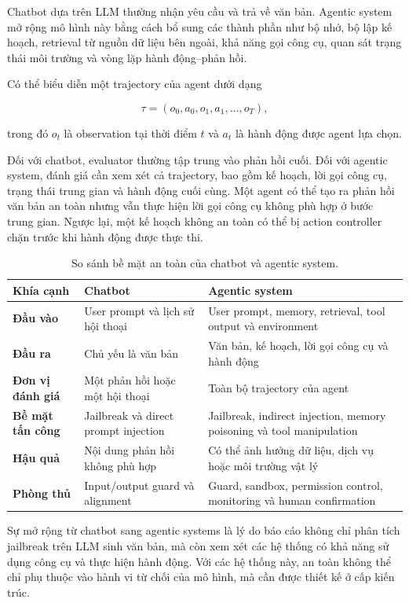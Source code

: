 Chatbot dựa trên LLM thường nhận yêu cầu và trả về văn bản. Agentic system
mở rộng mô hình này bằng cách bổ sung các thành phần như bộ nhớ, bộ lập kế
hoạch, retrieval từ nguồn dữ liệu bên ngoài, khả năng gọi công cụ, quan sát
trạng thái môi trường và vòng lặp hành động--phản hồi.

Có thể biểu diễn một trajectory của agent dưới dạng

\begin{equation}
    \tau
    =
    \left(
        o_0,
        a_0,
        o_1,
        a_1,
        \ldots,
        o_T
    \right),
    \label{eq:agent-trajectory}
\end{equation}

trong đó $o_t$ là observation tại thời điểm $t$ và $a_t$ là hành động được
agent lựa chọn.

Đối với chatbot, evaluator thường tập trung vào phản hồi cuối. Đối với
agentic system, đánh giá cần xem xét cả trajectory, bao gồm kế hoạch, lời
gọi công cụ, trạng thái trung gian và hành động cuối cùng. Một agent có
thể tạo ra phản hồi văn bản an toàn nhưng vẫn thực hiện lời gọi công cụ
không phù hợp ở bước trung gian. Ngược lại, một kế hoạch không an toàn có
thể bị action controller chặn trước khi hành động được thực thi.

\begin{table}[H]
\centering
\caption{So sánh bề mặt an toàn của chatbot và agentic system.}
\label{tab:chatbot-agent-security-comparison}
\begin{tabularx}{\textwidth}{
    >{\bfseries}p{}
    p{}
    X
}
\toprule
Khía cạnh
& Chatbot
& Agentic system \\
\midrule

Đầu vào
& User prompt và lịch sử hội thoại
& User prompt, memory, retrieval, tool output và environment \\

Đầu ra
& Chủ yếu là văn bản
& Văn bản, kế hoạch, lời gọi công cụ và hành động \\

Đơn vị đánh giá
& Một phản hồi hoặc một hội thoại
& Toàn bộ trajectory của agent \\

Bề mặt tấn công
& Jailbreak và direct prompt injection
& Jailbreak, indirect injection, memory poisoning và tool manipulation \\

Hậu quả
& Nội dung phản hồi không phù hợp
& Có thể ảnh hưởng dữ liệu, dịch vụ hoặc môi trường vật lý \\

Phòng thủ
& Input/output guard và alignment
& Guard, sandbox, permission control, monitoring và human confirmation \\

\bottomrule
\end{tabularx}
\end{table}

Sự mở rộng từ chatbot sang agentic systems là lý do báo cáo không chỉ phân
tích jailbreak trên LLM sinh văn bản, mà còn xem xét các hệ thống có khả
năng sử dụng công cụ và thực hiện hành động. Với các hệ thống này, an toàn
không thể chỉ phụ thuộc vào hành vi từ chối của mô hình, mà cần được thiết
kế ở cấp kiến trúc.
